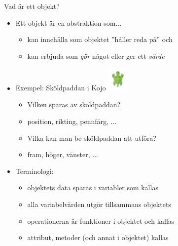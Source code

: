 \begin{Slide}{Vad är ett objekt?}
\begin{itemize}
\item Ett objekt är en abstraktion som...
\begin{itemize}
  \item kan innehålla  som objektet ''håller reda på'' och
  \item kan erbjuda  som \emph{gör} något eller ger ett \emph{värde}
\end{itemize}

\pause

\item Exempel: Sköldpaddan i Kojo \includegraphics[width=0.08\textwidth]{../img/turtle.png}
\begin{itemize}
  \item Vilken  sparas av sköldpaddan?
  \pause
  \item[] position, rikting, pennfärg, ...

  \item Vilka  kan man be sköldpaddan att utföra?

  \item[] fram, höger, vänster, ...
  \pause


\end{itemize}

\item Terminologi:
\begin{itemize}
  \item objektets data sparas i variabler som kallas 
  \item alla variabelvärden utgör tillsammans objektets 
  \item operationerna är funktioner i objektet och kallas 
  \item attribut, metoder (och annat i objektet) kallas 
\end{itemize}
\end{itemize}
\end{Slide}



